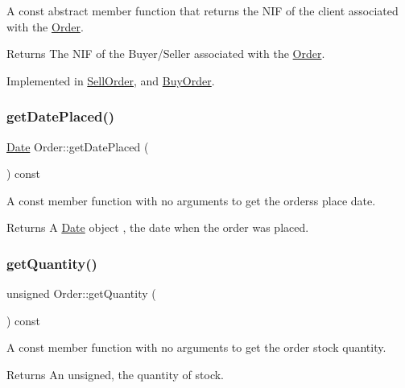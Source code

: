 A const abstract member function that returns the N\+IF of the client associated with the \hyperlink{class_order}{Order}. \begin{DoxyReturn}{Returns}
The N\+IF of the Buyer/\+Seller associated with the \hyperlink{class_order}{Order}. 
\end{DoxyReturn}


Implemented in \hyperlink{class_sell_order_a2f34e30d8bc5c891c40d8b80342cc34d}{Sell\+Order}, and \hyperlink{class_buy_order_ab79597b9bf0656216b2283bfa3a650e0}{Buy\+Order}.

\mbox{\label{class_order_a8ffb9095f78f8a3b1942e7995516007c}} 
\subsubsection{\texorpdfstring{get\+Date\+Placed()}{getDatePlaced()}}
{\footnotesize\ttfamily \hyperlink{class_date}{Date} Order\+::get\+Date\+Placed (\begin{DoxyParamCaption}{ }\end{DoxyParamCaption}) const}

A const member function with no arguments to get the orders\textquotesingle{}s place date. \begin{DoxyReturn}{Returns}
A \hyperlink{class_date}{Date} object , the date when the order was placed. 
\end{DoxyReturn}
\mbox{\label{class_order_a1d34436da1dbc3ffad588505eca5ff49}} 
\subsubsection{\texorpdfstring{get\+Quantity()}{getQuantity()}}
{\footnotesize\ttfamily unsigned Order\+::get\+Quantity (\begin{DoxyParamCaption}{ }\end{DoxyParamCaption}) const}

A const member function with no arguments to get the order stock quantity. \begin{DoxyReturn}{Returns}
An unsigned, the quantity of stock. 
\end{DoxyReturn}
\mbox{\label{class_order_aa008956fd77ac3d254117443b7d916fa}} 
